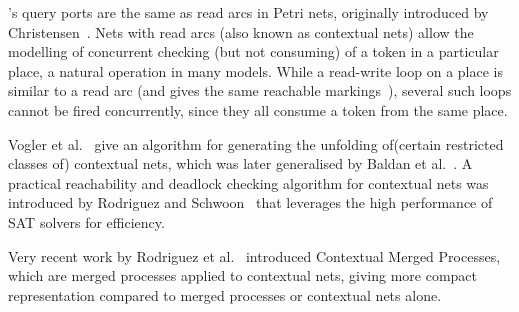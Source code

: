 \penrose's query ports are the same as read arcs in Petri nets, originally
introduced by Christensen~\cite{Christensen1993}. Nets with read arcs (also
known as contextual nets) allow the modelling of concurrent checking (but not
consuming) of a token in a particular place, a natural operation in many
models. While a read-write loop on a place is similar to a read arc (and gives
the same reachable markings~\cite{Baldan2008}), several such loops cannot be
fired concurrently, since they all consume a token from the same place.

{Vogler et al.}~\cite{Vogler1998} give an algorithm for generating the unfolding
of(certain restricted classes of) contextual nets, which was later generalised
by {Baldan et al.}~\cite{Baldan2008}. A practical reachability and deadlock
checking algorithm for contextual nets was introduced by {Rodriguez and
Schwoon}~\cite{Rodriguez2012} that leverages the high performance of SAT
solvers for efficiency.

Very recent work by {Rodriguez et al.}~\cite{Rodriguez2013} introduced
Contextual Merged Processes, which are merged processes applied to contextual
nets, giving more compact representation compared to merged processes or
contextual nets alone.
